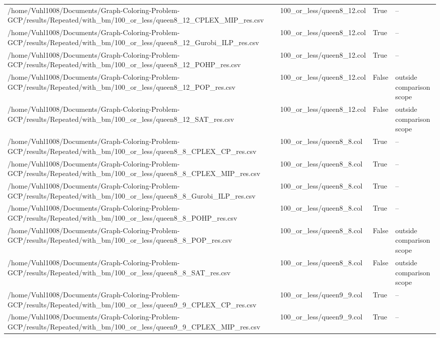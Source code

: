 \begin{table}[htbp]
\begin{tabular}{llll}
/home/Vuhl1008/Documents/Graph-Coloring-Problem-GCP/results/Repeated/with\_bm/100\_or\_less/queen8\_12\_CPLEX\_MIP\_res.csv & 100\_or\_less/queen8\_12.col & True & -- \\
/home/Vuhl1008/Documents/Graph-Coloring-Problem-GCP/results/Repeated/with\_bm/100\_or\_less/queen8\_12\_Gurobi\_ILP\_res.csv & 100\_or\_less/queen8\_12.col & True & -- \\
/home/Vuhl1008/Documents/Graph-Coloring-Problem-GCP/results/Repeated/with\_bm/100\_or\_less/queen8\_12\_POHP\_res.csv & 100\_or\_less/queen8\_12.col & True & -- \\
/home/Vuhl1008/Documents/Graph-Coloring-Problem-GCP/results/Repeated/with\_bm/100\_or\_less/queen8\_12\_POP\_res.csv & 100\_or\_less/queen8\_12.col & False & outside comparison scope \\
/home/Vuhl1008/Documents/Graph-Coloring-Problem-GCP/results/Repeated/with\_bm/100\_or\_less/queen8\_12\_SAT\_res.csv & 100\_or\_less/queen8\_12.col & False & outside comparison scope \\
/home/Vuhl1008/Documents/Graph-Coloring-Problem-GCP/results/Repeated/with\_bm/100\_or\_less/queen8\_8\_CPLEX\_CP\_res.csv & 100\_or\_less/queen8\_8.col & True & -- \\
/home/Vuhl1008/Documents/Graph-Coloring-Problem-GCP/results/Repeated/with\_bm/100\_or\_less/queen8\_8\_CPLEX\_MIP\_res.csv & 100\_or\_less/queen8\_8.col & True & -- \\
/home/Vuhl1008/Documents/Graph-Coloring-Problem-GCP/results/Repeated/with\_bm/100\_or\_less/queen8\_8\_Gurobi\_ILP\_res.csv & 100\_or\_less/queen8\_8.col & True & -- \\
/home/Vuhl1008/Documents/Graph-Coloring-Problem-GCP/results/Repeated/with\_bm/100\_or\_less/queen8\_8\_POHP\_res.csv & 100\_or\_less/queen8\_8.col & True & -- \\
/home/Vuhl1008/Documents/Graph-Coloring-Problem-GCP/results/Repeated/with\_bm/100\_or\_less/queen8\_8\_POP\_res.csv & 100\_or\_less/queen8\_8.col & False & outside comparison scope \\
/home/Vuhl1008/Documents/Graph-Coloring-Problem-GCP/results/Repeated/with\_bm/100\_or\_less/queen8\_8\_SAT\_res.csv & 100\_or\_less/queen8\_8.col & False & outside comparison scope \\
/home/Vuhl1008/Documents/Graph-Coloring-Problem-GCP/results/Repeated/with\_bm/100\_or\_less/queen9\_9\_CPLEX\_CP\_res.csv & 100\_or\_less/queen9\_9.col & True & -- \\
/home/Vuhl1008/Documents/Graph-Coloring-Problem-GCP/results/Repeated/with\_bm/100\_or\_less/queen9\_9\_CPLEX\_MIP\_res.csv & 100\_or\_less/queen9\_9.col & True & -- \\

\end{tabular}
\end{table}
